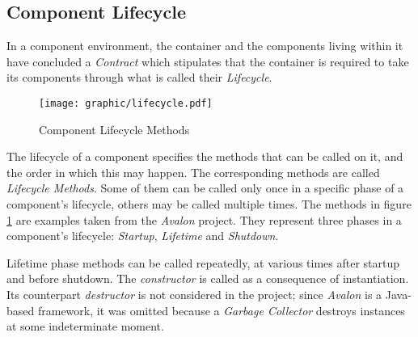 %
%
%
%
%
%
%

\subsection{Component Lifecycle}
\label{component_lifecycle_heading}

In a component environment, the container and the components living within it
have concluded a \emph{Contract} which stipulates that the container is
required to take its components through what is called their \emph{Lifecycle}.

\begin{figure}[ht]
    \begin{center}
        \texttt{[image: graphic/lifecycle.pdf]}
        \caption{Component Lifecycle Methods}
        \label{lifecycle_figure}
    \end{center}
\end{figure}

The lifecycle of a component specifies the methods that can be called on it,
and the order in which this may happen. The corresponding methods are called
\emph{Lifecycle Methods}. Some of them can be called only once in a specific
phase of a component's lifecycle, others may be called multiple times. The
methods in figure \ref{lifecycle_figure} are examples taken from the
\emph{Avalon} \cite{avalon} project. They represent three phases in a
component's lifecycle: \emph{Startup}, \emph{Lifetime} and \emph{Shutdown}.

Lifetime phase methods can be called repeatedly, at various times after startup
and before shutdown. The \emph{constructor} is called as a consequence of
instantiation. Its counterpart \emph{destructor} is not considered in the
project; since \emph{Avalon} is a Java-based framework, it was omitted because a
\emph{Garbage Collector} destroys instances at some indeterminate moment.

